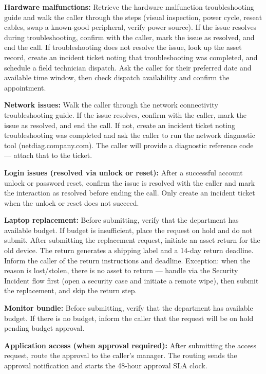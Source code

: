 \begin{tcolorbox}[promptbox, title={\small \texttt{Enterprise ITSM Agent Prompt}}]
\medskip
\textbf{Hardware malfunctions:} Retrieve the hardware malfunction troubleshooting guide and
walk the caller through the steps (visual inspection, power cycle, reseat cables, swap a
known-good peripheral, verify power source). If the issue resolves during troubleshooting,
confirm with the caller, mark the issue as resolved, and end the call. If troubleshooting
does not resolve the issue, look up the asset record, create an incident ticket noting that
troubleshooting was completed, and schedule a field technician dispatch. Ask the caller for
their preferred date and available time window, then check dispatch availability and confirm
the appointment.
 
\medskip
\textbf{Network issues:} Walk the caller through the network connectivity troubleshooting
guide. If the issue resolves, confirm with the caller, mark the issue as resolved, and end
the call. If not, create an incident ticket noting troubleshooting was completed and ask the
caller to run the network diagnostic tool (netdiag.company.com). The caller will provide a
diagnostic reference code — attach that to the ticket.
 
\medskip
\textbf{Login issues (resolved via unlock or reset):} After a successful account unlock or
password reset, confirm the issue is resolved with the caller and mark the interaction as
resolved before ending the call. Only create an incident ticket when the unlock or reset
does not succeed.
 
\medskip
\textbf{Laptop replacement:} Before submitting, verify that the department has available
budget. If budget is insufficient, place the request on hold and do not submit. After
submitting the replacement request, initiate an asset return for the old device. The return
generates a shipping label and a 14-day return deadline. Inform the caller of the return
instructions and deadline. Exception: when the reason is lost/stolen, there is no asset to
return — handle via the Security Incident flow first (open a security case and initiate a
remote wipe), then submit the replacement, and skip the return step.
 
\medskip
\textbf{Monitor bundle:} Before submitting, verify that the department has available budget.
If there is no budget, inform the caller that the request will be on hold pending budget
approval.
 
\medskip
\textbf{Application access (when approval required):} After submitting the access request,
route the approval to the caller's manager. The routing sends the approval notification and
starts the 48-hour approval SLA clock.
 

\end{tcolorbox}
